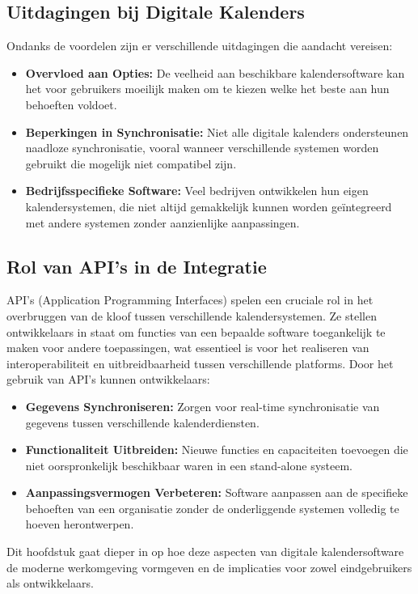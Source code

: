 \subsection{Uitdagingen bij Digitale Kalenders}
Ondanks de voordelen zijn er verschillende uitdagingen die aandacht vereisen:
\begin{itemize}
    \item \textbf{Overvloed aan Opties:} De veelheid aan beschikbare kalendersoftware kan het voor gebruikers moeilijk maken om te kiezen welke het beste aan hun behoeften voldoet.
    \item \textbf{Beperkingen in Synchronisatie:} Niet alle digitale kalenders ondersteunen naadloze synchronisatie, vooral wanneer verschillende systemen worden gebruikt die mogelijk niet compatibel zijn.
    \item \textbf{Bedrijfsspecifieke Software:} Veel bedrijven ontwikkelen hun eigen kalendersystemen, die niet altijd gemakkelijk kunnen worden geïntegreerd met andere systemen zonder aanzienlijke aanpassingen.
\end{itemize}

\subsection{Rol van API's in de Integratie}
API's (Application Programming Interfaces) spelen een cruciale rol in het overbruggen van de kloof tussen verschillende kalendersystemen. Ze stellen ontwikkelaars in staat om functies van een bepaalde software toegankelijk te maken voor andere toepassingen, wat essentieel is voor het realiseren van interoperabiliteit en uitbreidbaarheid tussen verschillende platforms. Door het gebruik van API's kunnen ontwikkelaars:
\begin{itemize}
    \item \textbf{Gegevens Synchroniseren:} Zorgen voor real-time synchronisatie van gegevens tussen verschillende kalenderdiensten.
    \item \textbf{Functionaliteit Uitbreiden:} Nieuwe functies en capaciteiten toevoegen die niet oorspronkelijk beschikbaar waren in een stand-alone systeem.
    \item \textbf{Aanpassingsvermogen Verbeteren:} Software aanpassen aan de specifieke behoeften van een organisatie zonder de onderliggende systemen volledig te hoeven herontwerpen.
\end{itemize}

Dit hoofdstuk gaat dieper in op hoe deze aspecten van digitale kalendersoftware de moderne werkomgeving vormgeven en de implicaties voor zowel eindgebruikers als ontwikkelaars.



